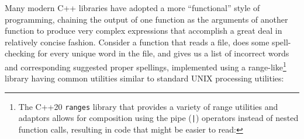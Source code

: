Many modern C++ libraries have adopted a more ``functional'' style of
programming, chaining the output of one function as the arguments of
another function to produce very complex expressions that accomplish a
great deal in relatively concise fashion. 
Consider a function that reads a file,
does some spell-checking for every unique word in the file, and gives us a
list of incorrect words and corresponding suggested proper spellings,
implemented using a range-like{\cprotect\footnote{The C++20 \lstinline!ranges! library that provides a variety of range utilities and adaptors allows for composition using the pipe (\lstinline!|!) operators instead of nested function calls, resulting in code that might be easier to read:

}} library having common utilities similar to
standard UNIX processing utilities:

